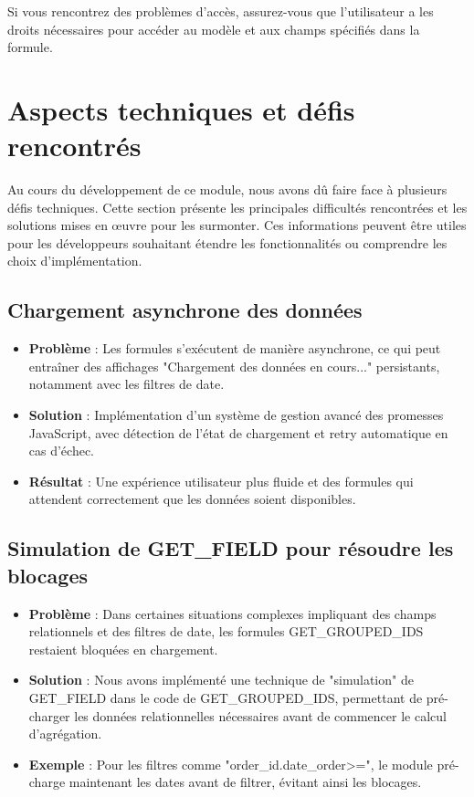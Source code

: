 \documentclass[12pt, a4paper]{article}
\begin{document}
\begin{warning}
Si vous rencontrez des problèmes d'accès, assurez-vous que l'utilisateur a les droits nécessaires pour accéder au modèle et aux champs spécifiés dans la formule.
\end{warning}

\section{Aspects techniques et défis rencontrés}

Au cours du développement de ce module, nous avons dû faire face à plusieurs défis techniques. Cette section présente les principales difficultés rencontrées et les solutions mises en œuvre pour les surmonter. Ces informations peuvent être utiles pour les développeurs souhaitant étendre les fonctionnalités ou comprendre les choix d'implémentation.

\subsection{Chargement asynchrone des données}

\begin{itemize}
    \item \textbf{Problème} : Les formules s'exécutent de manière asynchrone, ce qui peut entraîner des affichages "Chargement des données en cours..." persistants, notamment avec les filtres de date.
    \item \textbf{Solution} : Implémentation d'un système de gestion avancé des promesses JavaScript, avec détection de l'état de chargement et retry automatique en cas d'échec.
    \item \textbf{Résultat} : Une expérience utilisateur plus fluide et des formules qui attendent correctement que les données soient disponibles.
\end{itemize}

\subsection{Simulation de GET\_FIELD pour résoudre les blocages}

\begin{itemize}
    \item \textbf{Problème} : Dans certaines situations complexes impliquant des champs relationnels et des filtres de date, les formules GET\_GROUPED\_IDS restaient bloquées en chargement.
    \item \textbf{Solution} : Nous avons implémenté une technique de "simulation" de GET\_FIELD dans le code de GET\_GROUPED\_IDS, permettant de pré-charger les données relationnelles nécessaires avant de commencer le calcul d'agrégation.
    \item \textbf{Exemple} : Pour les filtres comme "order\_id.date\_order>=", le module pré-charge maintenant les dates avant de filtrer, évitant ainsi les blocages.
\end{itemize}
\end{document}
